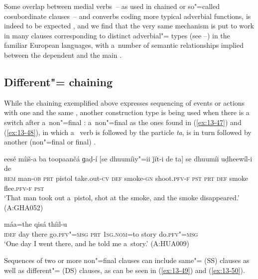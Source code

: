 Some overlap between medial verbs~-- as used in chained or so"=called cosubordinate clauses~-- and converbs coding more typical adverbial functions, is indeed to be expected \citep[26]{haspelmath1995}, and we find that the very same mechanism is put to work in many clauses corresponding to distinct adverbial"= types (see --) in the familiar European languages, with a~number of semantic relationships implied between the dependent  and the main . 


\subsection{Different"= chaining}
\label{subsec:13-3-2}


While the chaining exemplified above expresses sequencing of events or actions with one and the same , another construction type is being used when there is a~ switch after a~non"=final : a~non"=final  as the ones found in (\ref{ex:13-47}) and (\ref{ex:13-48}), in which a~ verb is followed by the particle \textit{ta}, is in turn followed by another (non"=final or final) .

\begin{exe}
\ex
\label{ex:13-47}
\gll eesé míiš-a ba toopaančá ɡaḍ-í [se dhuumíiy"=ii ǰít-i de ta] se dhuumíi uḍheewíl-i de \\
\textsc{rem} man-\textsc{ob} \textsc{prt} pistol take.out-\textsc{cv} \textsc{def}  smoke-\textsc{gn} shoot.\textsc{pfv-f} \textsc{pst} \textsc{prt} \textsc{def} smoke flee.\textsc{pfv-f} \textsc{pst} \\
\glt `That man took out a~pistol, shot at the smoke, and the smoke disappeared.' (A:GHA052)

\ex
\label{ex:13-48}
 máa=the qisá thíil-u \\
\textsc{idef} day there go.\textsc{pfv"=msg } \textsc{prt} \textsc{1sg.nom}=to story do.\textsc{pfv"=msg}  \\
\glt `One day I went there, and he told me a~story.' (A:HUA009) 
\end{exe}

Sequences of two or more non"=final clauses can include same"= (SS) clauses as well as different"= (DS) clauses, as can be seen in (\ref{ex:13-49}) and (\ref{ex:13-50}).

